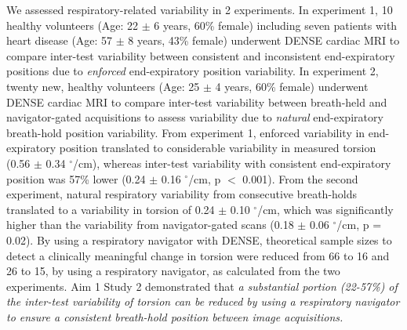 	We assessed respiratory-related variability in 2 experiments. In experiment 1, 10 healthy volunteers (Age: 22 $\pm$ 6 years, 60\% female) including seven patients with heart disease (Age: 57 $\pm$ 8 years, 43\% female) underwent DENSE cardiac MRI to compare inter-test variability between consistent and inconsistent end-expiratory positions due to \textit{enforced} end-expiratory position variability. In experiment 2, twenty new, healthy volunteers (Age: 25 $\pm$ 4 years, 60\% female) underwent DENSE cardiac MRI to compare inter-test variability between breath-held and navigator-gated acquisitions to assess variability due to \textit{natural} end-expiratory breath-hold position variability. From experiment 1, enforced variability in end-expiratory position translated to considerable variability in measured torsion (0.56 $\pm$ 0.34 $^{\circ}$/cm), whereas inter-test variability with consistent end-expiratory position was 57\% lower (0.24 $\pm$ 0.16 $^{\circ}$/cm, p $<$ 0.001). From the second experiment, natural respiratory variability from consecutive breath-holds translated to a variability in torsion of 0.24 $\pm$ 0.10 $^{\circ}$/cm, which was significantly higher than the variability from navigator-gated scans (0.18 $\pm$ 0.06 $^{\circ}$/cm, p = 0.02). By using a respiratory navigator with DENSE, theoretical sample sizes to detect a clinically meaningful change in torsion were reduced from 66 to 16 and 26 to 15, by using a respiratory navigator, as calculated from the two experiments. Aim 1 Study 2 demonstrated that \textit{a substantial portion (22-57\%) of the inter-test variability of torsion can be reduced by using a respiratory navigator to ensure a consistent breath-hold position between image acquisitions.}

